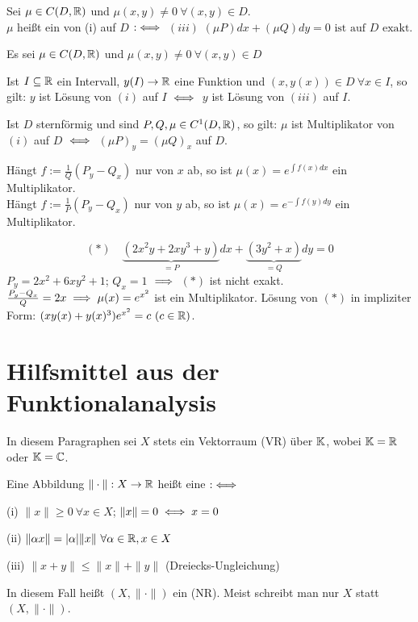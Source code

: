 \documentclass[a4paper,twoside,DIV15,BCOR12mm]{scrbook}
\begin{document}
\begin{definition}
Sei $\mu \in C(D,\mathbb{R})$ und $\mu(x,y)\ne0 \ \forall(x,y)\in  D$.\\
$\mu$ heißt ein  von (i) auf $D$
$:\iff$ $(iii)$ $(\mu P)dx + (\mu Q)dy = 0 \text{ ist auf }D\text{ exakt.}$
\end{definition}

\begin{bemerkung}
Es sei $\mu\in C(D,\mathbb{R})$ und $\mu(x,y) \ne 0 \ \forall(x,y)\in D$
\begin{liste}
\item Ist $I\subseteq \mathbb{R}$ ein Intervall, $y(I)\to\mathbb{R}$ eine Funktion und $(x,y(x)) \in D \ \forall x\in I$, so gilt: $y$ ist Lösung von $(i)$ auf $I$ $\iff$ $y$ ist Lösung von $(iii)$ auf $I$.
\item Ist $D$ sternförmig und sind $P,Q,\mu\in C^1(D,\mathbb{R})$, so gilt: $\mu$ ist Multiplikator von $(i)$ auf $D$ $\iff$ $(\mu P)_y = (\mu Q)_x$ auf $D$.
\item Hängt $f:=\frac1Q(P_y-Q_x)$ nur von $x$ ab, so ist $\mu(x)=e^{\int{f(x)} dx}$ ein Multiplikator.\\
Hängt $f:=\frac1P(P_y-Q_x)$ nur von $y$ ab, so ist $\mu(x)=e^{-\int{f(y)} dy}$ ein Multiplikator.
\begin{beispiel}
$$(*)\quad \underbrace{(2x^2y+2xy^3+y)}_{=P} dx + \underbrace{(3y^2+x)}_{=Q} dy = 0$$
$P_y=2x^2+6xy^2+1$; $Q_x=1$ $\implies$ $(*)$ ist nicht exakt. $\frac{P_y-Q_x}{Q} = 2x \implies \mu(x)=e^{x^2}$ ist ein Multiplikator. Lösung von $(*)$ in impliziter Form: $(xy(x) + y(x)^3)e^{x^2}=c\ (c\in\mathbb{R})$.
\end{beispiel}
\end{liste}
\end{bemerkung}

\chapter{Hilfsmittel aus der Funktionalanalysis}

In diesem Paragraphen sei $X$ stets ein Vektorraum (VR) über $\mathbb{K}$, wobei $\mathbb{K}=\mathbb{R}$ oder $\mathbb{K} = \mathbb{C}$.

\begin{definition}
Eine Abbildung $\|\cdot\|:X\to\mathbb{R}$ heißt eine  $:\iff$
\begin{liste}
\item[(i)] $\|x\| \ge 0\ \forall x\in X$; $\|x\| = 0 \iff x=0$
\item[(ii)] $\|\alpha x \| = |\alpha| \|x\| \ \forall \alpha\in\mathbb{R}, x\in X$
\item[(iii)] $\|x+y\| \le \|x\| + \|y\|$ (Dreiecks-Ungleichung)
\end{liste}
\end{definition}
In diesem Fall heißt $(X,\|\cdot\|)$ ein  (NR). Meist schreibt man nur $X$ statt $(X,\|\cdot\|)$.
\end{document}

